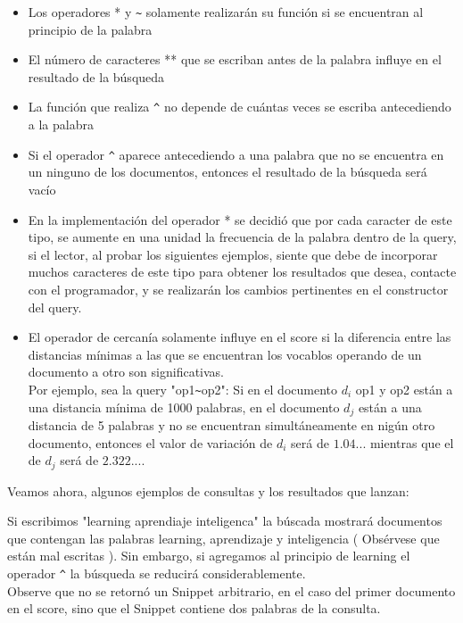 \documentclass[12pt]{article}
\begin{document}
   \begin{itemize}
   	\item Los operadores * y \verb|~| solamente realizar\'an su funci\'on si se encuentran al principio de la palabra \\
   	
   	\item El n\'umero de caracteres ** que se escriban antes de la palabra influye en el resultado de la b\'usqueda \\
   	
   	\item La funci\'on que realiza \verb|^| no depende de cu\'antas veces se escriba antecediendo a la palabra \\
   	
   	\item Si el operador \verb|^| aparece antecediendo a una palabra que no se encuentra en un ninguno de los documentos, entonces el resultado de la b\'usqueda ser\'a vac\'io \\
   	
   	\item En la implementaci\'on del operador * se decidi\'o que por cada caracter de este tipo, se aumente en una unidad la frecuencia de la palabra dentro de la query, si el lector, al probar los siguientes ejemplos, siente que debe de incorporar muchos caracteres de este tipo para obtener los resultados que desea, contacte con el programador, y se realizar\'an los cambios pertinentes en el constructor del query. 
   	
   	\item El operador de cercan\'ia solamente influye en el score si la diferencia entre las distancias m\'inimas a las que se encuentran los vocablos operando de un documento a otro son significativas. \\
   	 Por ejemplo, sea la query "op1\verb|~|op2": 
   	 Si en el documento $d_{i}$  op1 y op2 est\'an a una distancia m\'inima de 1000 palabras, en el documento $d_{j}$ est\'an a una distancia de 5 palabras y no se encuentran simult\'aneamente en nig\'un otro documento, entonces el valor de variaci\'on de $d_{i}$ ser\'a de $1.04...$ mientras que el de $d_{j}$ ser\'a de $2.322...$. 
   \end{itemize} 

  \newpage
   Veamos ahora, algunos ejemplos de consultas y los resultados que lanzan:
   
  Si escribimos "learning aprendiaje inteligenca" la b\'uscada mostrar\'a documentos que contengan las palabras learning, aprendizaje y inteligencia ( Obs\'ervese que est\'an mal escritas ). Sin embargo, si agregamos al principio de learning el operador \verb|^| la b\'usqueda se reducir\'a considerablemente. \\
  Observe que no se retorn\'o un Snippet arbitrario, en el caso del primer documento en el score, sino que el Snippet contiene dos palabras de la consulta. \\
  
\end{document}
